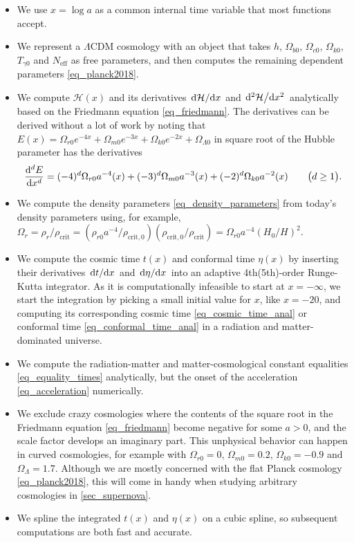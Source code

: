 \documentclass[10pt,a4paper]{article}
\begin{document}
\begin{itemize}
	\item We use $x = \log a$ as a common internal time variable that most functions accept.
	\item We represent a $\Lambda$CDM cosmology with an object that takes $h$, $\Omega_{b0}$, $\Omega_{c0}$, $\Omega_{k0}$, $T_{\gamma0}$ and $N_\text{eff}$ as free parameters, and then computes the remaining dependent parameters \eqref{eq_planck2018}.
	\item We compute $\mathcal{H}(x)$ and its derivatives $\odv{\mathcal{H}}/{x}$ and $\odv[2]{\mathcal{H}}/{x}$ analytically based on the Friedmann equation \eqref{eq_friedmann}.
	      The derivatives can be derived without a lot of work by noting that
		  $E(x) = \Omega_{r0} e^{-4x} + \Omega_{m0} e^{-3x} + \Omega_{k0} e^{-2x} + \Omega_{\Lambda0}$
		  in square root of the Hubble parameter has the derivatives
		  \begin{equation*}
			  \odv[d]{E}{x} = (-4)^d \Omega_{r0} a^{-4}(x) + (-3)^d \Omega_{m0} a^{-3}(x) + (-2)^d \Omega_{k0} a^{-2}(x) \qquad \big(d \geq 1\big).
		  \end{equation*}
	\item We compute the density parameters \eqref{eq_density_parameters} from today's density parameters using, for example, $\Omega_r = \rho_r / \rho_\text{crit} = (\rho_{r0} a^{-4} / \rho_{\text{crit},0}) (\rho_{\text{crit},0} / \rho_\text{crit}) = \Omega_{r0} a^{-4} (H_0 / H)^2$.
	\item We compute the cosmic time $t(x)$ and conformal time $\eta(x)$ by inserting their derivatives $\odv{t}/{x}$ and $\odv{\eta}/{x}$ into an adaptive 4th(5th)-order Runge-Kutta integrator.
	      As it is computationally infeasible to start at $x=-\infty$, we start the integration
	      by picking a small initial value for $x$, like $x = -20$,
	      and computing its corresponding cosmic time \eqref{eq_cosmic_time_anal} or conformal time \eqref{eq_conformal_time_anal} in a radiation and matter-dominated universe.
	\item We compute the radiation-matter and matter-cosmological constant equalities \eqref{eq_equality_times} analytically,
	      but the onset of the acceleration \eqref{eq_acceleration} numerically.
	\item We exclude crazy cosmologies where the contents of the square root in the Friedmann equation \eqref{eq_friedmann} become negative for some $a > 0$, and the scale factor develops an imaginary part.
	      This unphysical behavior can happen in curved cosmologies, for example with $\Omega_{r0} = 0$, $\Omega_{m0} = 0.2$, $\Omega_{k0}=-0.9$ and $\Omega_{\Lambda} = 1.7$.
		  Although we are mostly concerned with the flat Planck cosmology \eqref{eq_planck2018}, this will come in handy when studying arbitrary cosmologies in \cref{sec_supernova}.
	\item We spline the integrated $t(x)$ and $\eta(x)$ on a cubic spline, so subsequent computations are both fast and accurate.
\end{itemize}
\end{document}
